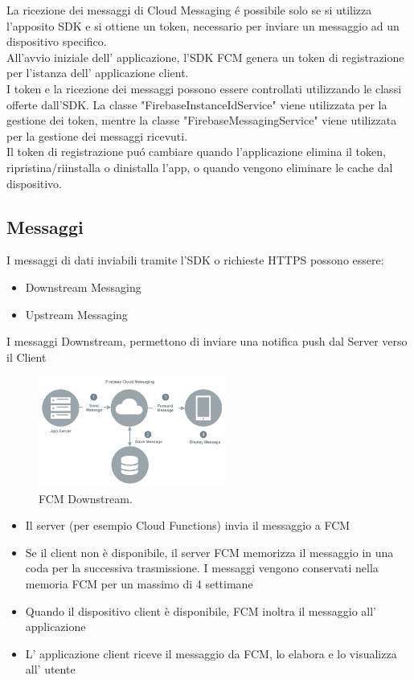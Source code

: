 \newpage
La ricezione dei messaggi di Cloud Messaging \'e possibile solo se si utilizza l'apposito SDK e si ottiene un token, necessario per inviare un messaggio ad un dispositivo specifico.\\
All'avvio iniziale dell' applicazione, l'SDK FCM genera un token di registrazione per l'istanza dell' applicazione client.\\
I token e la ricezione dei messaggi possono essere controllati utilizzando le classi offerte dall'SDK.
La classe "FirebaseInstanceIdService" viene utilizzata per la gestione dei token, mentre la classe "FirebaseMessagingService" viene utilizzata per la gestione dei messaggi ricevuti.\\
Il token di registrazione pu\'o cambiare quando l'applicazione elimina il token, ripristina/riinstalla o dinistalla l'app, o quando vengono eliminare le cache dal dispositivo.


\subsection{Messaggi}
I messaggi di dati inviabili tramite l'SDK o richieste HTTPS possono essere:
\begin{itemize}
    \item Downstream Messaging
    \item Upstream Messaging
\end{itemize}

I messaggi Downstream, permettono di inviare una notifica push dal Server verso il Client

\begin{figure}[!hb]
  \centering
  \includegraphics[width=0.55\textwidth]{immagini/fcm_down.png}
  \caption{FCM Downstream.}
  \label{fig:FCM Downstream}
\end{figure}




\begin{itemize}
    \item Il server (per esempio Cloud Functions) invia il messaggio a FCM
    \item Se il client non è disponibile, il server FCM memorizza il messaggio in una coda per la successiva trasmissione. I messaggi vengono conservati nella memoria FCM per un massimo di 4 settimane
    \item Quando il dispositivo client è disponibile, FCM inoltra il messaggio all' applicazione
    \item L' applicazione client riceve il messaggio da FCM, lo elabora e lo visualizza all' utente
\end{itemize}


